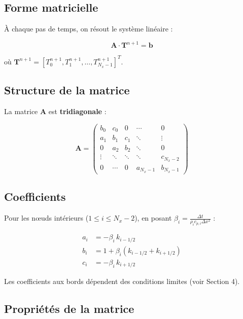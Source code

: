 \documentclass[11pt,a4paper]{article}
\begin{document}
\subsection{Forme matricielle}

À chaque pas de temps, on résout le système linéaire :

\begin{equation}
\mathbf{A} \cdot \mathbf{T}^{n+1} = \mathbf{b}
\end{equation}

où $\mathbf{T}^{n+1} = [T_0^{n+1}, T_1^{n+1}, \ldots, T_{N_x-1}^{n+1}]^T$.

\subsection{Structure de la matrice}

La matrice $\mathbf{A}$ est \textbf{tridiagonale} :

\begin{equation}
\mathbf{A} = \begin{pmatrix}
b_0 & c_0 & 0 & \cdots & 0 \\
a_1 & b_1 & c_1 & \ddots & \vdots \\
0 & a_2 & b_2 & \ddots & 0 \\
\vdots & \ddots & \ddots & \ddots & c_{N_x-2} \\
0 & \cdots & 0 & a_{N_x-1} & b_{N_x-1}
\end{pmatrix}
\end{equation}

\subsection{Coefficients}

Pour les nœuds intérieurs ($1 \leq i \leq N_x-2$), en posant $\beta_i = \frac{\Delta t}{\rho_i c_{p,i} \Delta x^2}$ :

\begin{align}
a_i &= -\beta_i \, k_{i-1/2} \\
b_i &= 1 + \beta_i (k_{i-1/2} + k_{i+1/2}) \\
c_i &= -\beta_i \, k_{i+1/2}
\end{align}

Les coefficients aux bords dépendent des conditions limites (voir Section 4).

\subsection{Propriétés de la matrice}
\end{document}
